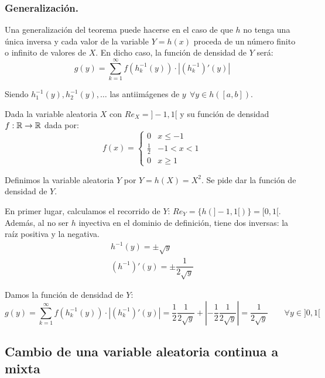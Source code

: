 \subsubsection{Generalización.}
Una generalización del teorema puede hacerse en el caso de que $h$ no tenga una única inversa y cada valor de la variable $Y=h(x)$ proceda de un número finito o infinito de valores de $X$. En dicho caso, la función de densidad de $Y$ será:
$$g(y) = \sum_{k=1}^{\infty} f(h^{-1}_k(y)) \cdot |(h^{-1}_k)'(y)|$$

Siendo $h_1^{-1}(y),h_2^{-1}(y), \ldots$ las antiimágenes de $y~~\forall y \in h([a,b])$.

\begin{ejemplo}
    Dada la variable aleatoria $X$ con $Re_X=]-1, 1[$ y su función de densidad $f:\mathbb R \rightarrow \mathbb R$ dada por:
    $$f(x) = \left\{ \begin{array}{ll}
        0           & x \leq -1  \\
        \frac{1}{2} & -1 < x < 1 \\
        0           & x \geq 1
    \end{array} \right. $$
    
    Definimos la variable aleatoria $Y$ por $Y=h(X) =X^2$. Se pide dar la función de densidad de $Y$.
    
    En primer lugar, calculamos el recorrido de $Y$: $Re_Y=\{h(]-1,1[)\} = [0,1[$. Además, al no ser $h$ inyectiva en el dominio de definición, tiene dos inversas: la raíz positiva y la negativa.
    \begin{gather*}
        h^{-1}(y) = \pm \sqrt{y}\\
        (h^{-1})'(y) = \pm \dfrac{1}{2\sqrt{y}}
    \end{gather*}
    
    Damos la función de densidad de $Y$:
    $$g(y) = \sum_{k=1}^{\infty} f(h^{-1}_k(y)) \cdot |(h^{-1}_k)'(y)|
    =  \dfrac{1}{2} \dfrac{1}{2\sqrt{y}} + \left|-\dfrac{1}{2} \dfrac{1}{2\sqrt{y}}\right|
    =  \dfrac{1}{2\sqrt{y}} \qquad \forall y \in ]0,1[$$
\end{ejemplo}

\subsection{Cambio de una variable aleatoria continua a mixta}

